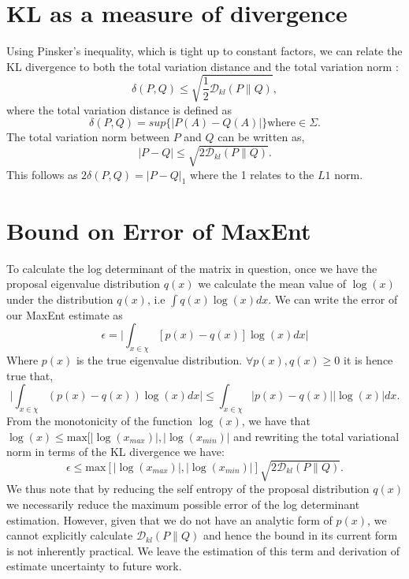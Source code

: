 \documentclass[letterpaper]{article} %
\begin{document}
\section{KL as a measure of divergence}
Using Pinsker's inequality, which is tight up to constant factors, we can relate the KL divergence to both the total variation distance and the total variation norm \cite{cover2012elements}:
\begin{equation}
\delta(P,Q) \leq \sqrt{\frac{1}{2}\mathcal{D}_{kl}(P\|Q)},
\end{equation}
where the total variation distance is defined as
\begin{equation}
\delta(P,Q) = sup \{|P(A)-Q(A)|\} \text{where} \in \Sigma. 
\end{equation}
The total variation norm between $P$ and $Q$ can be written as,
\begin{equation}
|P-Q| \leq \sqrt{2\mathcal{D}_{kl}(P\|Q)}.
\end{equation}
This follows as $2\delta(P,Q) = |P-Q|_{1}$ where the 1 relates to the $L{1}$ norm.

\section{Bound on Error of MaxEnt}
To calculate the log determinant of the matrix in question, once we have the proposal eigenvalue distribution $q(x)$ we calculate the mean value of $\log(x)$ under the distribution $q(x)$, i.e $\int q(x)\log(x)dx$. We can write the error of our MaxEnt estimate as
\begin{equation}
\epsilon = \biggl| \int_{x\in \chi}[p(x)-q(x)]\log(x)dx\biggr|
\end{equation}
Where $p(x)$ is the true eigenvalue distribution. $\forall p(x),q(x) \geq 0$ it is hence true that,
\begin{equation}
\biggl|\int_{x\in \chi}(p(x)-q(x))\log(x)dx\biggr| \leq  \int_{x\in \chi} |p(x)-q(x)||\log(x)| dx.
\end{equation}
From the monotonicity of the function $\log(x)$, we have that  $\log(x) \leq \mbox{max}[|\log(x_{max})|,|\log(x_{min})|$ and rewriting the total variational norm in terms of the KL divergence we have:
\begin{equation}
\label{errorequation}
\epsilon \leq \mbox{max}[|\log(x_{max})|,|\log(x_{min})|]\sqrt{2\mathcal{D}_{kl}(P\|Q)}.
\end{equation}
We thus note that by reducing the self entropy of the proposal distribution $q(x)$ we necessarily reduce the maximum possible error of the log determinant estimation. However, given that we do not have an analytic form of $p(x)$, we cannot explicitly calculate $\mathcal{D}_{kl}(P\|Q)$ and hence the bound in its current form is not inherently practical. We leave the estimation of this term and derivation of estimate uncertainty to future work.
\end{document}
